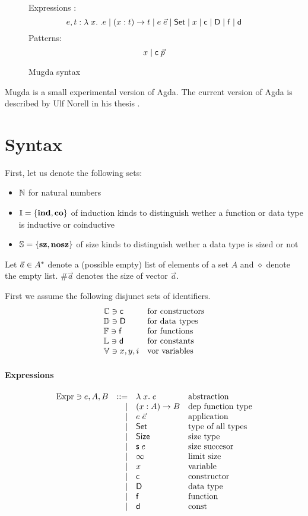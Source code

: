 \begin{figure}[p]
\caption{Mugda syntax}
Expressions : \[e,t :  \lambda\; x .\; . e \mid ( x : t ) \rightarrow{t} \mid e \; \vec{e} \mid  \mathsf{Set} \mid x \mid \mathsf{c} \mid \mathsf{D} \mid \mathsf{f} \mid \mathsf{d}\]
Patterns: \[ x  \mid \mathsf{c} \; \vec{p} \]
\end{figure}

Mugda is a small experimental version of Agda.
The current version of Agda is described by Ulf Norell in his thesis \cite{norell:thesis}.



\section{Syntax}
First, let us denote the following sets:
\begin{itemize}
\item
$ \mathbb{N} $ for natural numbers
\item
$ \mathbb{I} = \{ \mathbf{ind} , \mathbf{co} \} $ of induction kinds to distinguish wether a function or data type is 
inductive or coinductive  
\item
$ \mathbb{S} = \{ \mathbf{sz}, \mathbf{nosz} \} $ of size kinds to distinguish wether a data type is sized or not
\end{itemize}

Let $\vec{a} \in {A}^{\ast} $ denote a (possible empty) list of elements of a set $A$
and $\diamond$ denote the empty list. $\#\vec{a}$ denotes the size of vector $\vec{a}$.

First we assume the following disjunct sets of identifiers.
\[
\begin{array}{ll}
\mathbb{C} \ni \mathsf{c} & \mbox{for constructors}\\
\mathbb{D} \ni \mathsf{D} & \mbox{for data types}\\
\mathbb{F} \ni \mathsf{f} & \mbox{for functions}\\
\mathbb{L} \ni \mathsf{d} & \mbox{for constants}\\
\mathbb{V} \ni x,y,i & \mbox{vor variables}
\end{array}
\]

\paragraph*{Expressions}
\[
\begin{array}{lrll}
\mathrm{Expr} \ni e,A,B & ::= & \lambda\; x .\;{e} & \mbox{abstraction}\\
& \mid & ( x : A ) \rightarrow{B} & \mbox{dep function type}\\
& \mid & e \; \vec{e} & \mbox{application}\\
& \mid & \mathsf{Set} & \mbox{type of all types}\\
& \mid & \mathsf{Size} & \mbox{size type} \\
& \mid & \mathsf{s}\; e  & \mbox{size succesor}\\ 
& \mid & \infty & \mbox{limit size}\\
& \mid & x & \mbox{variable}\\
& \mid & \mathsf{c} & \mbox{constructor}\\
& \mid & \mathsf{D} & \mbox{data type}\\
& \mid & \mathsf{f} & \mbox{function}\\
& \mid & \mathsf{d} & \mbox{const}
\end{array}
\]

